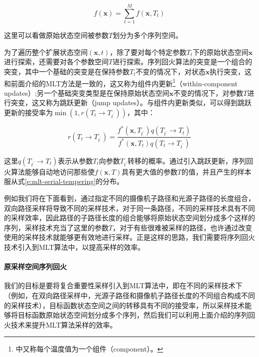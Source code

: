 \begin{equation}\label{e:mlt-serial-tempering}
	f(\mathbf{x})=\sum^{M}_{t=1}f(\mathbf{x},T_t)
\end{equation}

这里可以看做原始状态空间被参数$T$划分为多个序列空间。

为了遍历整个扩展状态空间$(\mathbf{x},t)$，除了要对每个特定参数$T_t$下的原始状态空间$\mathbf{x}$进行探索，还需要对各个参数空间$T$进行探索。序列回火算法的突变是一个组合的突变，其中一个基础的突变是在保持参数$T_t$不变的情况下，对状态$\mathbf{x}$执行突变，这和前面介绍的MLT方法是一致的，这又称为组件内更新\footnote{\cite{b:HandbookofMarkovChainMonteCarlo}中又称每个温度值为一个组件（component）。}（within-component updates）;另一个基础突变类型是在保持原始状态空间$\mathbf{x}$不变的情况下，对参数$T$进行突变，这又称为跳跃更新（jump updates）。与组件内更新类似，可以得到跳跃更新的接受率为$\min(1,r(T_t\to T_{t^{'}}))$，其中：

\begin{equation}
	r(T_t\to T_{t^{'}})=\frac{f^{*}(\mathbf{x},T_{t^{'}})q(T_{t^{'}}\to T_t)}{f^{*}(\mathbf{x},T_t)q(T_t\to T_{t^{'}})}
\end{equation}

\noindent 这里$q(T_{t^{'}}\to T_t)$表示从参数$T_t$向参数$T_{t^{'}}$转移的概率。通过引入跳跃更新，序列回火算法能够自动地访问那些使$f(\mathbf{x},T)$具有更大值的参数$T$的值，并且产生的样本服从式\ref{e:mlt-serial-tempering}的分布。

例如我们将在下面看到，通过指定不同的摄像机子路径和光源子路径的长度组合，双向路径采样将导致不同的采样技术，对于同一条路径，不同的采样技术具有不同的采样效率，因此路径的子路径长度的组合能够将原始状态空间划分成多个这样的序列，采样技术充当了这里的参数$T$，对于有些很难被采样的路径，也许通过改变使用的采样技术就能够更有效地进行采样。正是这样的思路，我们需要将序列回火技术引入到MLT算法中，以提高采样的效率。




\paragraph{原采样空间序列回火}
我们的目标是要将复合重要性采样引入到MLT算法中，即在不同的采样技术下（例如，在双向路径采样中，光源子路径和摄像机子路径长度的不同组合构成不同的采样技术），目标函数状态空间之间的转移具有不同的接受率，所以采样技术能够将目标函数原始状态空间划分成多个序列，然后我们可以利用上面介绍的序列回火技术来提升MLT算法采样的效率。

